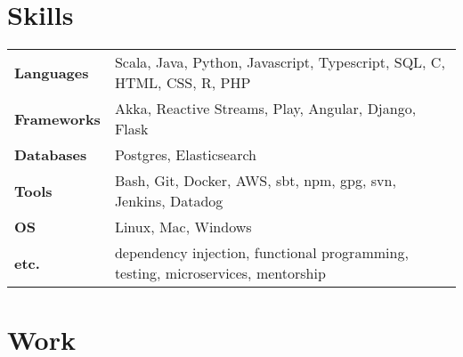\documentclass[10pt,letterpaper]{article}
\begin{document}
  \setcounter{secnumdepth}{0}

  \section{Skills}

  \noindent
  \begin{tabularx}{\textwidth}{@{}lX@{}}
    \textbf{Languages} & Scala, Java, Python, Javascript, Typescript, SQL, C, HTML, CSS, R, PHP \\
    \textbf{Frameworks} & Akka, Reactive Streams, Play, Angular, Django, Flask \\
    \textbf{Databases} & Postgres, Elasticsearch \\
    \textbf{Tools} & Bash, Git, Docker, AWS, sbt, npm, gpg, svn, Jenkins, Datadog \\
    \textbf{OS} & Linux, Mac, Windows \\
    \textbf{etc.} & dependency injection, functional programming, testing, microservices, mentorship
  \end{tabularx}

  \section{Work}
\end{document}
